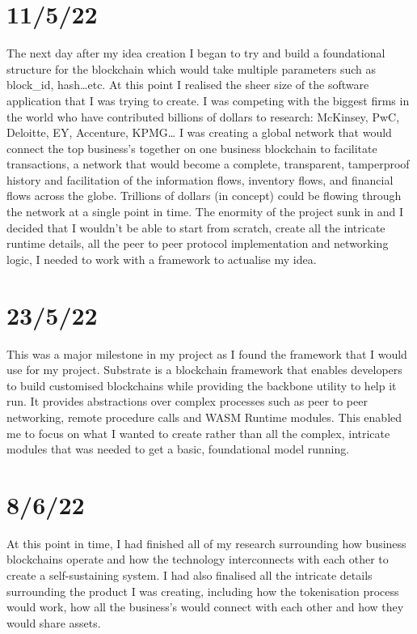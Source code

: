 \section{11/5/22}
The next day after my idea creation I began to try and build a foundational structure for the blockchain which would take multiple parameters such as block\_id, hash…etc. At this point I realised the sheer size of the software application that I was trying to create. I was competing with the biggest firms in the world who have contributed billions of dollars to research: McKinsey, PwC, Deloitte, EY, Accenture, KPMG… I was creating a global network that would connect the top business’s together on one business blockchain to facilitate transactions, a network that would become a complete, transparent, tamperproof history and facilitation of the information flows, inventory flows, and financial flows across the globe. Trillions of dollars (in concept) could be flowing through the network at a single point in time. The enormity of the project sunk in and I decided that I wouldn’t be able to start from scratch, create all the intricate runtime details, all the peer to peer protocol implementation and networking logic, I needed to work with a framework to actualise my idea. \\
\section{23/5/22}
This was a major milestone in my project as I found the framework that I would use for my project. Substrate is a blockchain framework that enables developers to build customised blockchains while providing the backbone utility to help it run. It provides abstractions over complex processes such as peer to peer networking, remote procedure calls and WASM Runtime modules. This enabled me to focus on what I wanted to create rather than all the complex, intricate modules that was needed to get a basic, foundational model running. \\
\section{8/6/22}
At this point in time, I had finished all of my research surrounding how business blockchains operate and how the technology interconnects with each other to create a self-sustaining system. I had also finalised all the intricate details surrounding the product I was creating, including how the tokenisation process would work, how all the business’s would connect with each other and how they would share assets. \\
